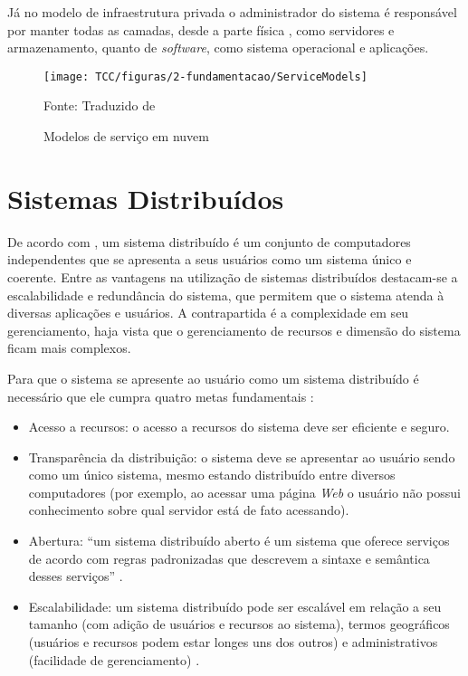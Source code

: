 Já no modelo de infraestrutura privada o administrador do sistema é responsável por manter todas as camadas, desde a parte física , como servidores e armazenamento, quanto de \textit{software}, como sistema operacional e aplicações.

\begin{figure}[!htpb]
	\centering
	\caption{Modelos de serviço em nuvem}
    \texttt{[image: TCC/figuras/2-fundamentacao/ServiceModels]}
    
	Fonte: Traduzido de \cite{servicemodelsimage}
 	\label{service_models}
\end{figure}

\section{Sistemas Distribuídos}

De acordo com , um sistema distribuído é um conjunto de computadores independentes que se apresenta a seus usuários como um sistema único e coerente. Entre as vantagens na utilização de sistemas distribuídos destacam-se a escalabilidade e redundância do sistema, que permitem que o sistema atenda à diversas aplicações e usuários. A contrapartida é a complexidade em seu gerenciamento, haja vista que o gerenciamento de recursos e dimensão do sistema ficam mais complexos.

Para que o sistema se apresente ao usuário como um sistema distribuído é necessário que ele cumpra quatro metas fundamentais \cite{tanenbaum}:

\begin{itemize}
    \item Acesso a recursos: o acesso a recursos do sistema deve ser eficiente e seguro.
    \item Transparência da distribuição: o sistema deve se apresentar ao usuário sendo como um único sistema, mesmo estando distribuído entre diversos computadores (por exemplo, ao acessar uma página \textit{Web} o usuário não possui conhecimento sobre qual servidor está de fato acessando).
    \item Abertura: ``um sistema distribuído aberto é um sistema que oferece serviços de acordo com regras padronizadas que descrevem a sintaxe e semântica desses serviços''  \cite{tanenbaum}.
    \item Escalabilidade: um sistema distribuído pode ser escalável em relação a seu tamanho (com adição de usuários e recursos ao sistema), termos geográficos (usuários e recursos podem estar longes uns dos outros) e administrativos (facilidade de gerenciamento) \cite{tanenbaum}.
\end{itemize}

